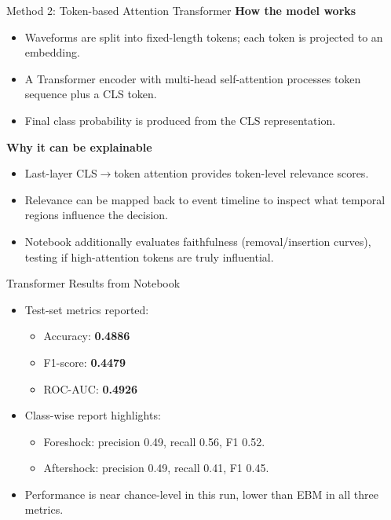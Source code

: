 \documentclass[aspectratio=169]{beamer}
\begin{document}
\begin{frame}{Method 2: Token-based Attention Transformer}
\textbf{How the model works}
\begin{itemize}
  \item Waveforms are split into fixed-length tokens; each token is projected to an embedding.
  \item A Transformer encoder with multi-head self-attention processes token sequence plus a CLS token.
  \item Final class probability is produced from the CLS representation.
\end{itemize}

\textbf{Why it can be explainable}
\begin{itemize}
  \item Last-layer CLS$\rightarrow$token attention provides token-level relevance scores.
  \item Relevance can be mapped back to event timeline to inspect what temporal regions influence the decision.
  \item Notebook additionally evaluates faithfulness (removal/insertion curves), testing if high-attention tokens are truly influential.
\end{itemize}
\end{frame}

\begin{frame}{Transformer Results from Notebook}
\begin{itemize}
  \item Test-set metrics reported:
  \begin{itemize}
    \item Accuracy: \textbf{0.4886}
    \item F1-score: \textbf{0.4479}
    \item ROC-AUC: \textbf{0.4926}
  \end{itemize}
  \item Class-wise report highlights:
  \begin{itemize}
    \item Foreshock: precision 0.49, recall 0.56, F1 0.52.
    \item Aftershock: precision 0.49, recall 0.41, F1 0.45.
  \end{itemize}
  \item Performance is near chance-level in this run, lower than EBM in all three metrics.
\end{itemize}
\end{frame}
\end{document}

